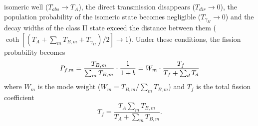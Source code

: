 isomeric well ($T_{abs}\rightarrow T_{A}$), the direct transmission
disappears ($T_{dir}\rightarrow0$), the population probability of the
isomeric%
 state becomes negligible ($T_{\gamma_{II}}\rightarrow0$)
and the decay widths of the class II state exceed the distance between them (%
$%
\coth[(T_{A}+\sum_{m}T_{B,m}+T_{\gamma_{II}})/2]\rightarrow1$). Under these
conditions, the fission probability becomes
\begin{equation}
P_{f,m}=\frac{T_{B,m}}{\sum_{m}T_{B,m}}\cdot\frac{1}{1+b}=W_{m}\cdot\frac{%
T_{f}}{T_{f}+\sum_{d}T_{d}}  \label{wm}
\end{equation}
\noindent where $W_{m}$ is the mode weight ($W_{m}=T_{B,m}/\sum_{m}T_{B,m}$)
and $T_{f}$ is the total fission coefficient
\begin{equation}
T_{f}=\frac{T_{A}\sum_{m}T_{B,m}}{T_{A}+\sum_{m}T_{B,m}}.
\end{equation}

